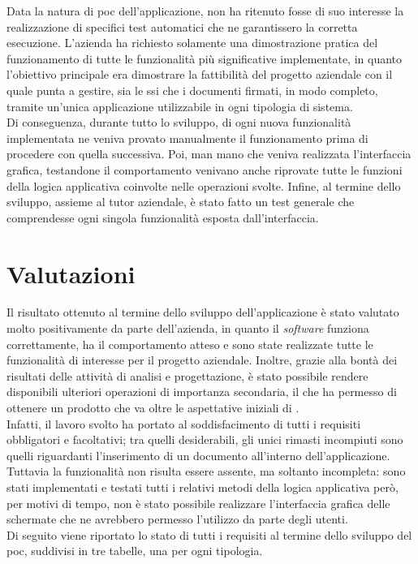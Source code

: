 Data la natura di \gls{poc} dell'applicazione, \myCompany{} \companyTitle{} non ha ritenuto fosse di suo interesse la realizzazione di specifici test automatici che ne garantissero la corretta esecuzione. L'azienda ha richiesto solamente una dimostrazione pratica del funzionamento di tutte le funzionalità più significative implementate, in quanto l'obiettivo principale era dimostrare la fattibilità del progetto aziendale con il quale punta a gestire, sia le \gls{ssi} che i documenti firmati, in modo completo, tramite un'unica applicazione utilizzabile in ogni tipologia di sistema.\\
Di conseguenza, durante tutto lo sviluppo, di ogni nuova funzionalità implementata ne veniva provato manualmente il funzionamento prima di procedere con quella successiva. Poi, man mano che veniva realizzata l'interfaccia grafica, testandone il comportamento venivano anche riprovate tutte le funzioni della logica applicativa coinvolte nelle operazioni svolte. Infine, al termine dello sviluppo, assieme al tutor aziendale, è stato fatto un test generale che comprendesse ogni singola funzionalità esposta dall'interfaccia.

\section{Valutazioni}

Il risultato ottenuto al termine dello sviluppo dell'applicazione è stato valutato molto positivamente da parte dell'azienda, in quanto il \textit{software} funziona correttamente, ha il comportamento atteso e sono state realizzate tutte le funzionalità di interesse per il progetto aziendale. Inoltre, grazie alla bontà dei risultati delle attività di analisi e progettazione, è stato possibile rendere disponibili ulteriori operazioni di importanza secondaria, il che ha permesso di ottenere un prodotto che va oltre le aspettative iniziali di \myCompany{} \companyTitle{}.\\
Infatti, il lavoro svolto ha portato al soddisfacimento di tutti i requisiti obbligatori e facoltativi; tra quelli desiderabili, gli unici rimasti incompiuti sono quelli riguardanti l'inserimento di un documento all'interno dell'applicazione. Tuttavia la funzionalità non risulta essere assente, ma soltanto incompleta: sono stati implementati e testati tutti i relativi metodi della logica applicativa però, per motivi di tempo, non è stato possibile realizzare l'interfaccia grafica delle schermate che ne avrebbero permesso l'utilizzo da parte degli utenti.\\
Di seguito viene riportato lo stato di tutti i requisiti al termine dello sviluppo del \gls{poc}, suddivisi in tre tabelle, una per ogni tipologia.

